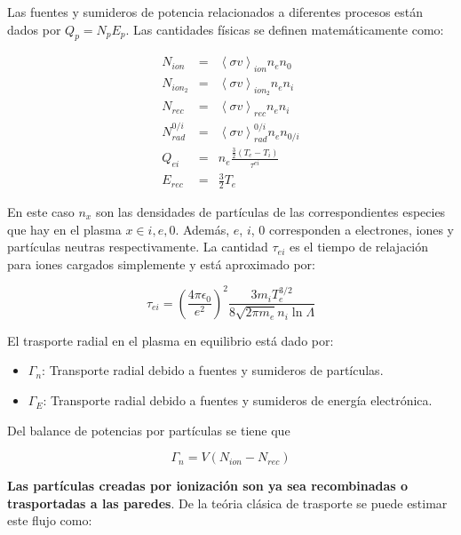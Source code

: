 \documentclass[11pt]{article}
\theoremstyle{definition}
\begin{document}
  Las fuentes y sumideros de potencia relacionados a diferentes procesos est\'an dados por $Q_p = N_pE_p$. Las cantidades f\'isicas se definen matem\'aticamente como:

  \begin{eqnarray}
    N_{ion} &=& \left<\sigma v\right>_{ion}n_en_0\\
    N_{ion_2} &=& \left<\sigma v\right>_{ion_2}n_en_i\\
    N_{rec} &=& \left<\sigma v\right>_{rec}n_en_i\\
    N_{rad}^{0/i} &=& \left<\sigma v\right>_{rad}^{0/i}n_en_{0/i}\\
    Q_{ei} &=& n_e\frac{\frac{3}{2}(T_e - T_i)}{\tau^{ei}} \label{eq:Qei} \\
    E_{rec} &=& \frac{3}{2}T_e
  \end{eqnarray}

  En este caso $n_x$ son las densidades de part\'iculas de las correspondientes especies que hay en el plasma $x \in {i,e,0}$. Adem\'as, $e$, $i$, $0$ corresponden a electrones, iones y part\'iculas neutras respectivamente. La cantidad $\tau_{ei}$ es el tiempo de relajaci\'on para iones cargados simplemente y est\'a aproximado por:

  \begin{equation}\label{eq:tau}
    \tau_{ei} = \left(\frac{4\pi\epsilon_0}{e^2}\right)^2\frac{3m_iT_e^{3/2}}{8\sqrt{2\pi m_e}n_i\ln{\Lambda}}
  \end{equation}

  El trasporte radial en el plasma en equilibrio est\'a dado por:

  \begin{itemize}
    \item $\Gamma_n$: Transporte radial debido a fuentes y sumideros de part\'iculas.
    \item $\Gamma_E$: Transporte radial debido a fuentes y sumideros de energ\'ia electr\'onica.
  \end{itemize}

  Del balance de potencias por part\'iculas se tiene que

  \begin{equation}\label{eq:7}
    \Gamma_n = V(N_{ion} - N_{rec})
  \end{equation}

  \textbf{Las part\'iculas creadas por ionizaci\'on son ya sea recombinadas o trasportadas a las paredes}. De la te\'oria cl\'asica de trasporte se puede estimar este flujo como:
\end{document}
